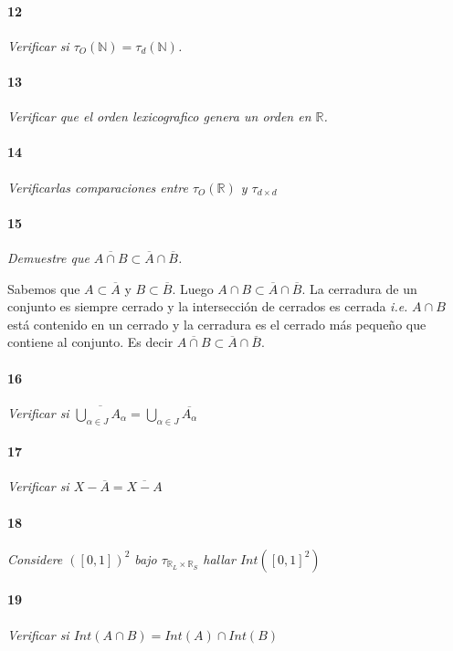 \documentclass[12pt]{article}
\begin{document}
\paragraph{12}
\textit{Verificar si $\tau_O (\mathbb{N})=\tau_d (\mathbb{N})$.}

\paragraph{13}
\textit{Verificar que el orden lexicografico genera un orden en $\mathbb{R}$.}

\paragraph{14}
\textit{Verificarlas comparaciones entre $\tau_O(\mathbb{R})$ y $\tau_{d\times d}$}

\paragraph{15}
\textit{Demuestre que $\overline{A \cap B} \subset \overline{A} \cap \overline{B}$.}

Sabemos que $A \subset \overline{A}$ y $B \subset \overline{B}$. Luego $A \cap B \subset \overline{A} \cap \overline{B}$. La cerradura de un conjunto es siempre
cerrado y la intersección de cerrados es cerrada \textit{i.e.} $A \cap B$ está contenido en un cerrado y la cerradura es el cerrado más pequeño que contiene al conjunto. Es decir
$\overline{A \cap B} \subset \overline{A} \cap \overline{B}$.

\paragraph{16}
\textit{Verificar si $\overline{\bigcup\limits_{\alpha\in J}A_{\alpha}}=\bigcup\limits_{\alpha\in J}\overline{A_{\alpha}}$}

\paragraph{17}
\textit{Verificar si $X-\overline{A}=\overline{X-A}$}

\paragraph{18}
\textit{Considere $([0,1])^2$ bajo $\tau_{\mathbb{R}_L\times\mathbb{R}_S}$ hallar $Int([0,1]^2)$}

\paragraph{19}
\textit{Verificar si $Int(A\cap B)=Int(A)\cap Int(B)$}
\end{document}
